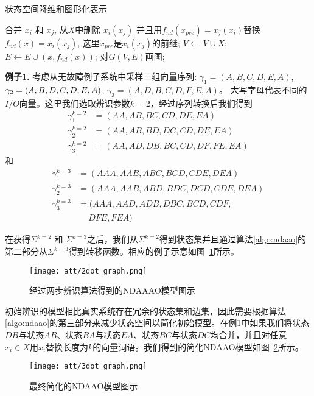 \begin{algorithm}[h]
  \caption{状态空间降维和图形化表示}
  \label{algo:graph}
   \begin{algorithmic}[1]
        \State 合并 $x_i$ 和 $x_j$, 从$X$中删除 $x_i(x_j)$ 并且用$f_{nd}(x_{pre})=x_j(x_i)$替换$f_{nd}(x)=x_i(x_j)$, 这里$x_{pre}$是$x_i(x_j)$的前继;  
      \EndIf
    \EndFor
    \State $V\leftarrow\ V\cup X$;
    \State $E \leftarrow E\cup (x,f_{nd}(x))$;
    \State 对$G(V,E)$画图;
  \end{algorithmic}
\end{algorithm}
\textbf{例子1.} 考虑从无故障例子系统中采样三组向量序列: $\gamma_1=(A,B,C,D,E,A)$, $\gamma_2=(A,B,D,C,\\D,E,A)$, $\gamma_3=(A,D,B,C,D,F,E,A)$。 大写字母代表不同的$I/O$向量。这里我们选取辨识参数$k=2$，经过序列转换后我们得到 \[\begin{split} \gamma_1^{k=2}&=(AA,AB,BC,CD,DE,EA)\\ \gamma_2^{k=2}&=(AA,AB,BD,DC,CD,DE,EA)\\\gamma_3^{k=2}&=(AA,AD,DB,BC,CD,DF,FE,EA) \end{split}\] 和 \[\begin{split} \gamma_1^{k=3}&=(AAA,AAB,ABC,BCD,CDE,DEA)\\ \gamma_2^{k=3}&=(AAA,AAB,ABD,BDC,DCD,CDE,DEA)\\\gamma_3^{k=3}&=(AAA,AAD,ADB,DBC,BCD,CDF,\\&\quad \ DFE,FEA) \end{split}\]

在获得$\Sigma^{k=2}$ 和 $\Sigma^{k=3}$之后，我们从$\Sigma^{k=2}$得到状态集并且通过算法\ref{algo:ndaao}的第二部分从$\Sigma^{k=3}$得到转移函数。相应的例子示意如图~\ref{fig5}所示。

\begin{figure}[!htb]
  \centering
  \texttt{[image: att/2dot\_graph.png]}
  \caption{经过两步辨识算法得到的NDAAAO模型图示}
  \label{fig5}
\end{figure}

初始辨识的模型相比真实系统存在冗余的状态集和边集，因此需要根据算法\ref{algo:ndaao}的第三部分来减少状态空间以简化初始模型。在例1中如果我们将状态$ DB $与状态$ AB $、状态$ BA $与状态$ EA $、状态$ BC $与状态$ DC $均合并，并且对任意$x_i \in X$用$x_i$替换长度为$k$的向量词语。我们得到的简化NDAAO模型如图~\ref{fig6}所示。

\begin{figure}[!htb]{}
  \centering
  \texttt{[image: att/3dot\_graph.png]}
  \caption{最终简化的NDAAO模型图示}
  \label{fig6}
\end{figure}


